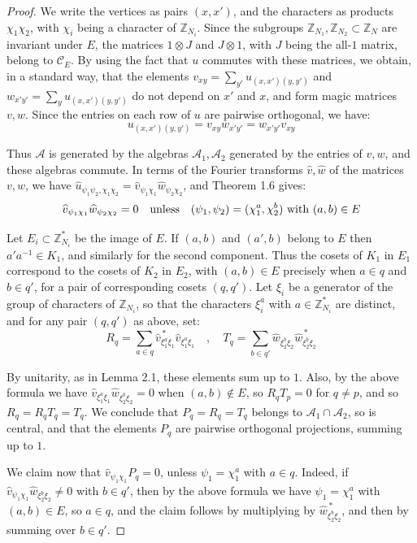 \documentclass[11pt]{amsart}
\newcommand{\A}{\mathcal A}
\newcommand{\C}{\mathcal C}
\newcommand{\Z}{\mathbb Z}
\newcommand{\hu}{\widehat u}
\begin{document}
\begin{proof}
We write the vertices as pairs $(x,x')$, and the characters as products $\chi_1\chi_2$, with $\chi_i$ being a character of $\Z_{N_i}$. Since the subgroups $\Z_{N_1},\Z_{N_2}\subset\Z_N$ are invariant under $E$, the matrices $1\otimes J$ and $J\otimes1$, with $J$ being the all-$1$ matrix, belong to $\C_E$. By using the fact that $u$ commutes with these matrices, we obtain, in a standard way, that the elements $v_{xy}=\sum_{y'}u_{(x,x')(y,y')}$ and $w_{x'y'}=\sum_yu_{(x,x')(y,y')}$ do not depend on $x'$ and $x$, and form magic matrices $v,w$. Since the entries on each row of $u$ are pairwise orthogonal, we have:
$$u_{(x,x')(y,y')}=v_{xy}w_{x'y'}=w_{x'y'}v_{xy}$$

Thus $\A$ is generated by the algebras $\A_1,\A_2$ generated by the entries of $v,w$, and these algebras commute. In terms of the Fourier transforms $\widehat{v},\widehat{w}$ of the matrices $v,w$, we have $\hu_{\psi_1\psi_2,\chi_1\chi_2}=\widehat{v}_{\psi_1\chi_1}\widehat{w}_{\psi_2\chi_2}$, and Theorem 1.6 gives:
$$\widehat{v}_{\psi_1\chi_1}\widehat{w}_{\psi_2\chi_2}=0\quad{\rm unless}\quad(\psi_1,\psi_2)=(\chi_1^a,\chi_2^b)\ {\rm with}\ (a,b)\in E$$

Let $E_i\subset\Z_{N_i}^*$ be the image of $E$. If $(a,b)$ and $(a',b)$ belong to $E$ then $a'a^{-1}\in K_1$, and similarly for the second component. Thus the cosets of $K_1$ in $E_1$ correspond to the cosets of $K_2$ in $E_2$, with $(a,b)\in E$ precisely when $a\in q$ and $b\in q'$, for a pair of corresponding cosets $(q,q')$. Let $\xi_i$ be a generator of the group of characters of $\Z_{N_i}$, so that the characters $\xi_i^a$ with $a\in\Z_{N_i}^*$ are distinct, and for any pair $(q,q')$ as above, set:
$$R_q=\sum_{a\in q}\widehat{v}_{\xi_1^a\xi_1}^{\,*}\widehat{v}_{\xi_1^a\xi_1}\quad,\quad T_q=\sum_{b\in q'}\widehat{w}_{\xi_2^b\xi_2}\widehat{w}_{\xi_2^b\xi_2}^{\,*}$$

By unitarity, as in Lemma 2.1, these elements sum up to $1$. Also, by the above formula we have $\widehat{v}_{\xi_1^a\xi_1}\widehat{w}_{\xi_2^b\xi_2}=0$ when $(a,b)\notin E$, so $R_qT_p=0$ for $q\neq p$, and so $R_q=R_qT_q=T_q$. We conclude that $P_q=R_q=T_q$ belongs to $\A_1\cap\A_2$, so is central, and that the elements $P_q$ are pairwise orthogonal projections, summing up to $1$.

We claim now that $\widehat{v}_{\psi_1\chi_1}P_q=0$, unless $\psi_1=\chi_1^a$ with $a\in q$. Indeed, if $\widehat{v}_{\psi_1\chi_1}\widehat{w}_{\xi_2^b\xi_2}\neq0$ with $b\in q'$, then by the above formula we have $\psi_1=\chi_1^a$ with $(a,b)\in E$, so $a\in q$, and the claim follows by multiplying by $\widehat{w}_{\xi_2^b\xi_2}^{\,*}$, and then by summing over $b\in q'$.


\end{proof}
\end{document}
